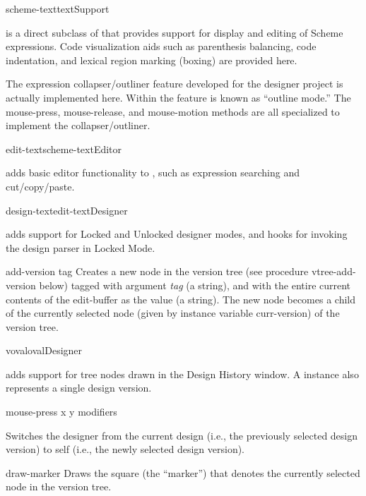 \documentclass{article}
\begin{document}
\begin{class}{scheme-text}{text}{Support}

 is a direct subclass of  that provides
support for display and editing of Scheme expressions.  Code
visualization aids such as parenthesis balancing, code indentation,
and lexical region marking (boxing) are provided here.

The expression collapser/outliner feature developed for the designer
project is actually implemented here.  Within  the
feature is known as ``outline mode.''  The {\sf mouse-press}, {\sf
mouse-release}, and {\sf mouse-motion} methods are all specialized to
implement the collapser/outliner.
\end{class}




\begin{class}{edit-text}{scheme-text}{Editor}

 adds basic editor functionality to
, such as expression searching and cut/copy/paste.
\end{class}




\begin{class}{design-text}{edit-text}{Designer}

 adds support for Locked and Unlocked designer modes,
and hooks for invoking the design parser in Locked Mode.

\begin{method}{add-version}{ tag}{}
Creates a new node in the version tree (see procedure {\sf
vtree-add-version} below) tagged with argument {\sl tag} (a string),
and with the entire current contents of the edit-buffer as the value
(a string).  The new node becomes a child of the currently selected
node (given by instance variable {\sf curr-version}) of the version
tree.
\end{method}
\end{class}






\begin{class}{voval}{oval}{Designer}


 adds support for tree nodes drawn in the Design History window. A
 instance also represents a single design version.


\begin{method}{mouse-press}{ x y modifiers}{}

Switches the designer from the current design (i.e., the previously
selected design version) to {\sf self} (i.e., the newly selected
design version).
\end{method}


\begin{method}{draw-marker}{}{}
Draws the square (the ``marker'') that denotes the currently selected
node in the version tree.
\end{method}
\end{class}
\end{document}
